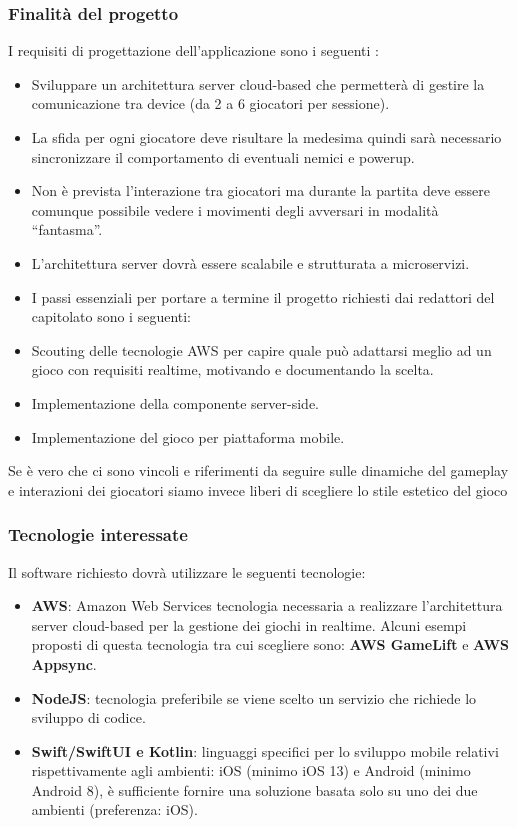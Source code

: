 		\subsubsection{Finalità del progetto}
			I requisiti di progettazione dell’applicazione sono i seguenti :
			\begin{itemize}
				\item Sviluppare un architettura server cloud-based che permetterà di gestire la comunicazione tra device (da 2 a 6 giocatori per sessione).
				\item La sfida per ogni giocatore deve risultare la medesima quindi sarà necessario sincronizzare il comportamento di eventuali nemici e powerup. 
				\item Non è prevista l’interazione tra giocatori ma durante la partita deve essere comunque possibile vedere i movimenti degli avversari in modalità “fantasma”.
				\item L’architettura server dovrà essere scalabile e strutturata a microservizi.
			\end{itemize}
			\begin{itemize}
				\item I passi essenziali per portare a termine il progetto richiesti dai redattori del capitolato sono i seguenti:
				\item Scouting delle tecnologie AWS per capire quale può adattarsi meglio ad un gioco con requisiti realtime, motivando e documentando la scelta.
				\item Implementazione della componente server-side.
				\item Implementazione del gioco per piattaforma mobile.
			\end{itemize}
			Se è vero che ci sono vincoli e riferimenti da seguire sulle dinamiche del gameplay e interazioni dei giocatori siamo invece liberi di scegliere lo stile estetico del gioco
		\subsubsection{Tecnologie interessate}
			Il software richiesto dovrà utilizzare le seguenti tecnologie:
			\begin{itemize}
				\item\textbf{AWS}: Amazon Web Services tecnologia necessaria a realizzare l’architettura server cloud-based per la gestione dei giochi in realtime. Alcuni esempi proposti di questa tecnologia tra cui scegliere sono: \textbf{AWS GameLift} e \textbf{AWS Appsync}.
				\item\textbf{NodeJS}: tecnologia preferibile se viene scelto un servizio che richiede lo sviluppo di codice.
				\item\textbf{Swift/SwiftUI e Kotlin}:  linguaggi specifici per lo sviluppo mobile relativi rispettivamente agli ambienti: iOS (minimo iOS 13) e Android (minimo Android 8), è sufficiente fornire una soluzione basata solo su uno dei due ambienti (preferenza: iOS).
			\end{itemize}
			
